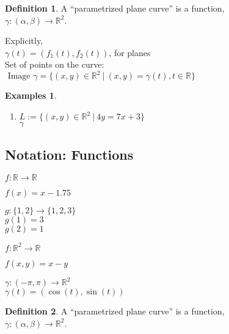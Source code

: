 \documentclass[twocolumn,20pt,fleqn]{extarticle}
\newcommand{\sep}{\vspace{0.5cm}}
\theoremstyle{plain}
\theoremstyle{definition}
\newtheorem*{definition}{Definition}
\newtheorem*{exmpls}{Examples}
\theoremstyle{remark}
\newenvironment*{examples}{\begin{exmpls} ~ \begin{enumerate}}{\end{enumerate}\end{exmpls}}
\begin{document}
\newpage



\begin{definition}
  A  ``parametrized plane curve''  is a  function,\\ $\gamma  : (\alpha, \beta) \to \mathbb{R}^2$.
\end{definition}

Explicitly,\\
$\gamma(t) = (f_1(t), f_2(t))$, for planes\\

Set of points on the curve:\\  $\textrm{ Image } \gamma = \{(x,y) \in \mathbb{R}^2 \ |\ (x,y) = \gamma(t), t \in \mathbb{R}\}$




\begin{examples}
  \item $L:=\{(x,y) \in \mathbb{R}^2\ |\ 4y = 7x + 3\}$\\
  $\gamma $\end{examples}


\clearpage




\subsection{Notation: Functions}

$ f: \mathbb{R}  \to \mathbb{R}$

$f(x) = x - 1.75$\\

\sep

  $g : \{1,2\} \to \{1,2,3\}$\\
    $g(1) = 3$\\
    $g(2) = 1$\\

\sep

$ f: \mathbb{R}^2  \to \mathbb{R}$

$f(  x,y  ) = x - y$


\sep

$\gamma :  (-\pi,\pi)  \to \mathbb{R}^2$\\
$\gamma(t) = (\cos(t), \sin(t))$



\newpage



\begin{definition}
  A  ``parametrized plane curve''  is a  function,\\ $\gamma  : (\alpha, \beta) \to \mathbb{R}^2$.
\end{definition}
\end{document}
